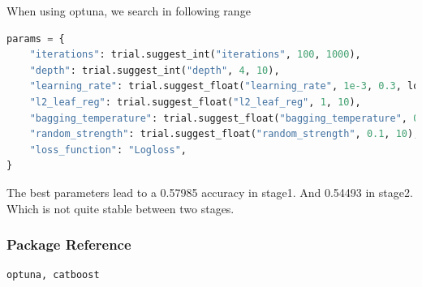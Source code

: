\par When using optuna, we search in following range
\begin{lstlisting}[language=Python]
params = {
    "iterations": trial.suggest_int("iterations", 100, 1000),
    "depth": trial.suggest_int("depth", 4, 10),
    "learning_rate": trial.suggest_float("learning_rate", 1e-3, 0.3, log=True),
    "l2_leaf_reg": trial.suggest_float("l2_leaf_reg", 1, 10),
    "bagging_temperature": trial.suggest_float("bagging_temperature", 0, 1),
    "random_strength": trial.suggest_float("random_strength", 0.1, 10),
    "loss_function": "Logloss",
}
\end{lstlisting}
The best parameters lead to a 0.57985 accuracy in stage1. And 0.54493 in stage2. Which is not quite stable between two stages. 
\subsubsection*{Package Reference}
\begin{lstlisting}
optuna, catboost
\end{lstlisting}